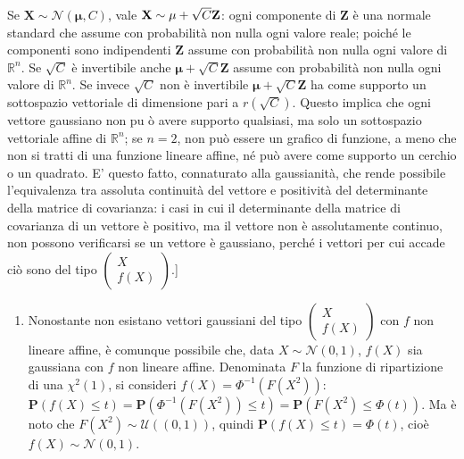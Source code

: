 \documentclass{article}
\begin{document}
Se $\mathbf{X}\sim \mathcal{N}\left( \mathbf{\mu },C\right) $, vale $\mathbf{%
X}\sim \mathbf{\mu }+\sqrt{C}\mathbf{Z}$: ogni componente di $\mathbf{Z}$ 
\`{e} una normale standard che assume con probabilit\`{a} non nulla ogni
valore reale; poich\'{e} le componenti sono indipendenti $\mathbf{Z}$ assume
con probabilit\`{a} non nulla ogni valore di $%
\mathbb{R}
^{n}$. Se $\sqrt{C}$ \`{e} invertibile anche $\mathbf{\mu }+\sqrt{C}\mathbf{Z%
}$ assume con probabilit\`{a} non nulla ogni valore di $%
\mathbb{R}
^{n}$. Se invece $\sqrt{C}$ non \`{e} invertibile $\mathbf{\mu }+\sqrt{C}%
\mathbf{Z}$ ha come supporto un sottospazio vettoriale di dimensione pari a $%
r\left( \sqrt{C}\right) $. Questo implica che ogni vettore gaussiano non pu%
\`{o} avere supporto qualsiasi, ma solo un sottospazio vettoriale affine di $%
\mathbb{R}
^{n}$; se $n=2$, non pu\`{o} essere un grafico di funzione, a meno che non
si tratti di una funzione lineare affine, n\'{e} pu\`{o} avere come supporto
un cerchio o un quadrato. E' questo fatto, connaturato alla gaussianit\`{a},
che rende possibile l'equivalenza tra assoluta continuit\`{a} del vettore e
positivit\`{a} del determinante della matrice di covarianza: i casi in cui
il determinante della matrice di covarianza di un vettore \`{e} positivo, ma
il vettore non \`{e} assolutamente continuo, non possono verificarsi se un
vettore \`{e} gaussiano, perch\'{e} i vettori per cui accade ci\`{o} sono
del tipo $\left( 
\begin{array}{c}
X \\ 
f\left( X\right)%
\end{array}%
\right) $.]

\begin{enumerate}
\item Nonostante non esistano vettori gaussiani del tipo $\left( 
\begin{array}{c}
X \\ 
f\left( X\right)%
\end{array}%
\right) $ con $f$ non lineare affine, \`{e} comunque possibile che, data $%
X\sim \mathcal{N}\left( 0,1\right) $, $f\left( X\right) $ sia gaussiana con $%
f$ non lineare affine. Denominata $F$ la funzione di ripartizione di una $%
\chi ^{2}\left( 1\right) $, si consideri $f\left( X\right) =\Phi ^{-1}\left(
F\left( X^{2}\right) \right) $: $\mathbf{P}\left( f\left( X\right) \leq
t\right) =\mathbf{P}\left( \Phi ^{-1}\left( F\left( X^{2}\right) \right)
\leq t\right) =\mathbf{P}\left( F\left( X^{2}\right) \leq \Phi \left(
t\right) \right) $. Ma \`{e} noto che $F\left( X^{2}\right) \sim \mathcal{U}%
\left( \left( 0,1\right) \right) $, quindi $\mathbf{P}\left( f\left(
X\right) \leq t\right) =\Phi \left( t\right) $, cio\`{e} $f\left( X\right)
\sim \mathcal{N}\left( 0,1\right) $.
\end{enumerate}
\end{document}
